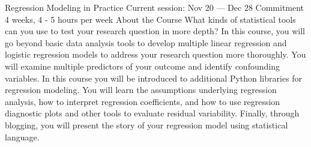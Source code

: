 Regression Modeling in Practice
Current session: Nov 20 — Dec 28
Commitment
4 weeks, 4 - 5 hours per week
About the Course
What kinds of statistical tools can you use to test your research question in more depth? In this course, you will go beyond basic data analysis tools to develop multiple linear regression and logistic regression models to address your research question more thoroughly. You will examine multiple predictors of your outcome and identify confounding variables. In this course you will be introduced to additional Python libraries for regression modeling. You will learn the assumptions underlying regression analysis, how to interpret regression coefficients, and how to use regression diagnostic plots and other tools to evaluate residual variability. Finally, through blogging, you will present the story of your regression model using statistical language.
